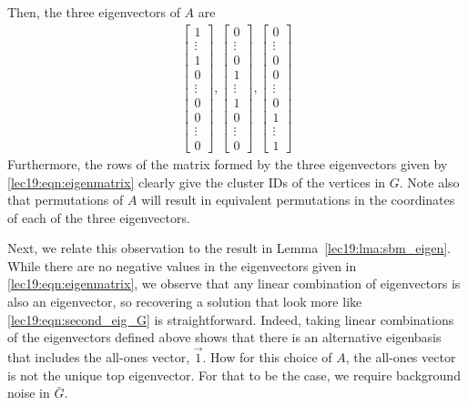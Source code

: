 Then, the three eigenvectors of $A$ are 
\begin{align}
    \begin{bmatrix}
        1 \\ \vdots \\ 1\\ 0 \\
        \vdots \\
        0 \\ 0 \\ \vdots \\ 0
      \end{bmatrix}, \begin{bmatrix}
        0 \\ \vdots \\ 0\\ 1 \\
        \vdots \\
        1 \\ 0 \\ \vdots \\ 0
      \end{bmatrix}, \begin{bmatrix}
        0 \\ \vdots \\ 0\\ 0 \\
        \vdots \\
        0 \\ 1 \\ \vdots \\ 1
      \end{bmatrix} \label{lec19:eqn:eigenmatrix}
\end{align}
Furthermore, the rows of the matrix formed by the three eigenvectors given by \eqref{lec19:eqn:eigenmatrix} clearly give the cluster IDs of the vertices in $G$. Note also that permutations of $A$ will result in equivalent permutations in the coordinates of each of the three eigenvectors.

Next, we relate this observation to the result in Lemma~\ref{lec19:lma:sbm_eigen}. While there are no negative values in the eigenvectors given in \eqref{lec19:eqn:eigenmatrix}, we observe that any linear combination of eigenvectors is also an eigenvector, so recovering a solution that look more like \eqref{lec19:eqn:second_eig_G} is straightforward. Indeed, taking linear combinations of the eigenvectors defined above shows that there is an alternative eigenbasis that includes the all-ones vector, $\vec{1}$. How for this choice of $A$, the all-ones vector is not the unique top eigenvector. For that to be the case, we require background noise in $\bar{G}$.

